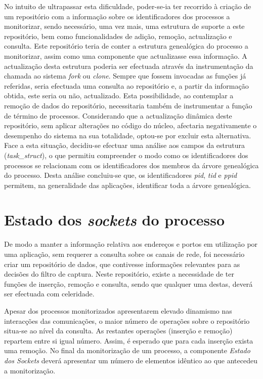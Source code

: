 No intuito de ultrapassar esta dificuldade, poder-se-ia ter recorrido à criação de um repositório com a informação sobre os identificadores dos processos a monitorizar, sendo necessário, uma vez mais, uma estrutura de suporte a este repositório, bem como funcionalidades de adição, remoção, actualização e consulta.
Este repositório teria de conter a estrutura genealógica do processo a monitorizar, assim como uma componente que actualizasse essa informação.
A actualização desta estrutura poderia ser efectuada através da instrumentação da chamada ao sistema \textit{fork} ou \textit{clone}.
Sempre que fossem invocadas as funções já referidas, seria efectuada uma consulta ao repositório e, a partir da informação obtida, este seria ou não, actualizado.
Esta possibilidade, ao contemplar a remoção de dados do repositório, necessitaria também de instrumentar a função de término de processos.
Considerando que a actualização dinâmica deste repositório, sem aplicar alterações no código do núcleo, afectaria negativamente o desempenho do sistema na sua totalidade, optou-se por excluir esta alternativa.
Face a esta situação, decidiu-se efectuar uma análise aos campos da estrutura (\textit{task\_struct}), o que permitiu compreender o modo como os identificadores dos processos se relacionam com os identificadores dos membros da árvore genealógica do processo.
Desta análise concluiu-se que, os identificadores \textit{pid}, \textit{tid} e \textit{ppid} permitem, na generalidade das aplicações, identificar toda a árvore genealógica.





\section{Estado dos \textit{sockets} do processo}

De modo a manter a informação relativa aos endereços e portos em utilização por uma aplicação, sem requerer a consulta sobre os canais de rede, foi necessário criar um repositório de dados, que contivesse informações relevantes para as decisões do filtro de captura.
Neste repositório, existe a necessidade de ter funções de inserção, remoção e consulta, sendo que qualquer uma destas, deverá ser efectuada com celeridade.

Apesar dos processos monitorizados apresentarem elevado dinamismo nas interacções das comunicações, o maior número de operações sobre o repositório situa-se ao nível da consulta.
As restantes operações (inserção e remoção) repartem entre si igual número.
Assim, é esperado que para cada inserção exista uma remoção.
No final da monitorização de um processo, a componente \textit{Estado dos Sockets} deverá apresentar um número de elementos idêntico ao que antecedeu a monitorização.

